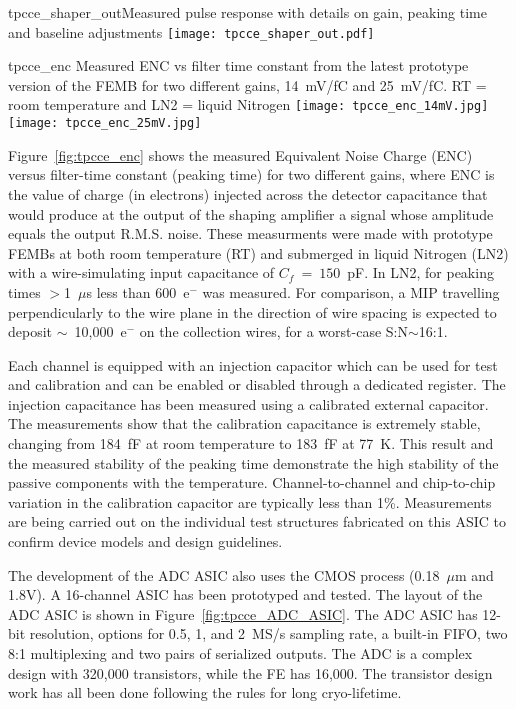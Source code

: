 \begin{cdrfigure}{tpcce_shaper_out}{Measured pulse response with
 details on gain, peaking time and baseline adjustments}
\texttt{[image: tpcce\_shaper\_out.pdf]}
\end{cdrfigure}

\begin{cdrfigure}{tpcce_enc}{
Measured ENC vs filter time constant from the latest prototype version of the FEMB
for two different gains, 14~mV/fC and 25~mV/fC. RT = room temperature and 
LN2 = liquid Nitrogen}
\texttt{[image: tpcce\_enc\_14mV.jpg]}
\texttt{[image: tpcce\_enc\_25mV.jpg]}
\end{cdrfigure}

Figure~\ref{fig:tpcce_enc} shows the measured Equivalent Noise Charge (ENC) versus 
filter-time constant (peaking time) for two different gains, where ENC is the value of charge 
(in electrons) injected across the detector capacitance that would produce at the output of the 
shaping amplifier a signal whose amplitude equals the output R.M.S. noise. These measurments
were made with prototype FEMBs at both room temperature (RT) and submerged in liquid
Nitrogen (LN2) with a wire-simulating input capacitance of $C_f~=~150$~pF.
In LN2, for peaking times $>$1~$\mu$s less than 600~e$^{-}$ was measured. For comparison,
a MIP travelling perpendicularly to the wire plane in the direction of wire spacing is
expected to deposit $\sim$~10,000~e$^{-}$ on the collection wires, for a worst-case
S:N$\sim$16:1.

Each channel is equipped with an injection capacitor which can be used
for test and calibration and can be enabled or disabled through a
dedicated register. The injection capacitance has been measured using 
a calibrated external capacitor. The measurements show
that the calibration capacitance is extremely stable, changing from
184~fF at room temperature to 183~fF at 77~K. This result and the measured
stability of the peaking time demonstrate the high stability of the
passive components with the temperature. Channel-to-channel and chip-to-chip
variation in the calibration capacitor are typically less than 1\%. Measurements are being carried
out on the individual test structures fabricated on this ASIC to
confirm device models and design guidelines.

The development of the ADC ASIC also uses the CMOS process (0.18~$\mu$m and 1.8V).
A 16-channel ASIC has been prototyped and tested.
The layout of the ADC ASIC is shown in Figure~\ref{fig:tpcce_ADC_ASIC}. 
The ADC ASIC has 12-bit resolution, options for 0.5, 1, and 2~MS/s sampling rate, a built-in FIFO, 
two 8:1 multiplexing and two pairs of serialized outputs.
The ADC is a complex design with 320,000 transistors, while the FE has 16,000.
The transistor design work has all been done following the rules for long cryo-lifetime.


